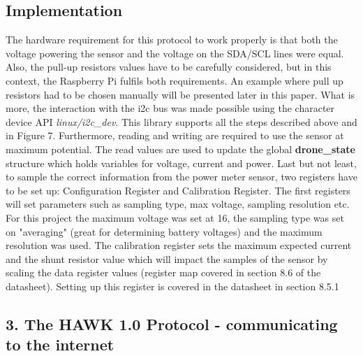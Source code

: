 \documentclass{IEEEtran}
\begin{document}
\subsection*{Implementation}
The hardware requirement for this protocol to work properly is that both the voltage powering the sensor and the voltage on the SDA/SCL lines were equal. Also, the pull-up resistors values have to be carefully considered, but in this context, the Raspberry Pi fulfils both requirements. An example where pull up resistors had to be chosen manually will be presented later in this paper. What is more, the interaction with the i2c bus was made possible using the character device API \textit{linux/i2c\_dev}. This library supports all the steps described above and in Figure 7.
\newline
\newline
Furthermore, reading and writing are required to use the sensor at maximum potential. The read values are used to update the global \textbf{drone\_state} structure which holds variables for voltage, current and power.
\newline
\newline
Last but not least, to sample the correct information from the power meter sensor, two registers have to be set up: Configuration Register and Calibration Register. The first registers will set parameters such as sampling type, max voltage, sampling resolution etc. For this project the maximum voltage was set at 16, the sampling type was set on "averaging" (great for determining battery voltages) and the maximum resolution was used. The calibration register sets the maximum expected current and the shunt resistor value which will impact the samples of the sensor by scaling the data register values (register map covered in section 8.6 of the datasheet). Setting up this register is covered in the datasheet in section 8.5.1
\subsection*{{3. The HAWK 1.0 Protocol - communicating to the internet}}
\end{document}
